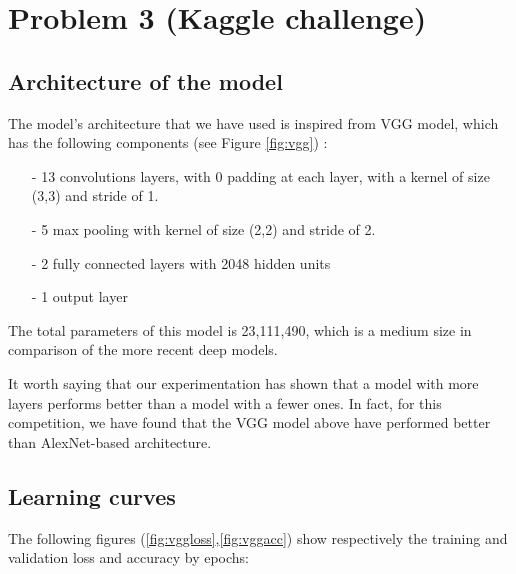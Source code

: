 \documentclass[a4paper]{article}
\begin{document}
\section{Problem 3 (Kaggle challenge)}
\label{sec:problem3}

\subsection{Architecture of the model}
The model's architecture that we have used is inspired from VGG model, which has the following components (see Figure \ref{fig:vgg}) :

\begin{itemize}
	\item[-] 13 convolutions layers, with 0 padding at each layer, with a kernel of size (3,3) and stride of 1.
	\item[-] 5 max pooling with kernel of size (2,2) and stride of 2.
	\item[-] 2 fully connected layers with 2048 hidden units
	\item[-] 1 output layer
\end{itemize}


The total parameters of this model is 23,111,490, which is a medium size in comparison of the more recent deep models.

It worth saying that our experimentation has shown that a model with more layers performs better than a model with a fewer ones. In fact, for this competition, we have found that the VGG model above have performed better than AlexNet-based architecture.

\subsection{Learning curves}
The following figures (\ref{fig:vggloss},\ref{fig:vggacc}) show respectively the training and validation loss and accuracy by epochs:
\end{document}
